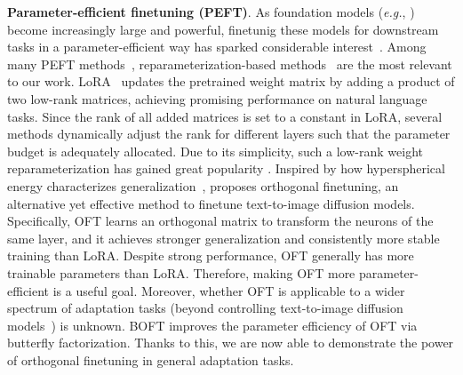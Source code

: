 \documentclass{article} %
\newcommand{\eg}{\emph{e.g.}}
\begin{document}
\textbf{Parameter-efficient finetuning (PEFT)}. As foundation models (\eg, \cite{brown2020language,radford2021learning,rombach2022high,kirillov2023segment})  become increasingly large and powerful, finetunig these models for downstream tasks in a parameter-efficient way has sparked considerable interest~\cite{treviso2023efficient,ding2023parameter,lialin2023scaling}. Among many PEFT methods~\cite{houlsby2019parameter,aghajanyan2020intrinsic,hulora2022,edalati2022krona,wang2022adamix,gheini2021cross,zaken2022bitfit,guo2020parameter,sung2021training,ansell2022composable,lester2021power,li2021prefix,vu2022spot,he2021towards,mao2021unipelt,karimi2021compacter,liu2022few,sung2022lst,chen2022parameter,jia2022visual,chen2022adaptformer,zhang2022neural,jie2023fact,lian2022scaling,luo2023towards}, reparameterization-based methods~\cite{aghajanyan2020intrinsic,hulora2022,edalati2022krona} are the most relevant to our work. LoRA~\cite{hulora2022} updates the pretrained weight matrix by adding a product of two low-rank matrices, achieving promising performance on natural language tasks. Since the rank of all added matrices is set to a constant in LoRA, several methods \cite{zhang2022adaptive,valipour2022dylora,zhang2023increlora} dynamically adjust the rank for different layers such that the parameter budget is adequately allocated. Due to its simplicity, such a low-rank weight reparameterization has gained great popularity 
 \cite{dettmers2023qlora,zi2023delta,chavan2023one}. Inspired by how hyperspherical energy characterizes generalization~\cite{liu2018learning,liu2021orthogonal}, \cite{qiu2023controlling} proposes orthogonal finetuning, an alternative yet effective method to finetune text-to-image diffusion models. Specifically, OFT learns an orthogonal matrix to transform the neurons of the same layer, and it achieves stronger generalization and consistently more stable training than LoRA. Despite strong performance, OFT generally has more trainable parameters than LoRA. Therefore, making OFT more parameter-efficient is a useful goal. Moreover, whether OFT is applicable to a wider spectrum of adaptation tasks (beyond controlling text-to-image diffusion models~\cite{qiu2023controlling}) is unknown. BOFT improves the parameter efficiency of OFT via butterfly factorization. Thanks to this, we are now able to demonstrate the power of orthogonal finetuning in general adaptation tasks.
\end{document}
